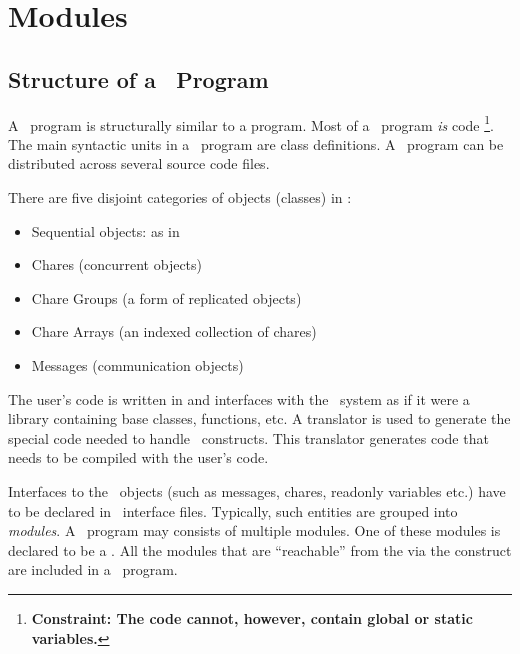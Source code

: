 \section{Modules}

\subsection{Structure of a \charmpp\ Program}

A \charmpp\ program is structurally similar to a \CC{} program.  Most of a
\charmpp\ program {\em is} \CC{} code \footnote{\bf Constraint: The \CC{} code
cannot, however, contain global or static variables.}. The main syntactic units
in a \charmpp\ program are class definitions. A \charmpp\ program can be
distributed across several source code files.

There are five disjoint categories of objects (classes) in \charmpp:

\begin{itemize}
\item Sequential objects: as in \CC{}
\item Chares (concurrent objects) 
\item Chare Groups  (a form of replicated objects)
\item Chare Arrays  (an indexed collection of chares)
\item Messages (communication objects)
\end{itemize}

The user's code is written in \CC{} and interfaces with the \charmpp\ system as
if it were a library containing base classes, functions, etc.  A translator is
used to generate the special code needed to handle \charmpp\ constructs.  This
translator generates \CC{} code that needs to be compiled with the user's code.

Interfaces to the \charmpp\ objects (such as messages, chares, readonly
variables etc.)  have to be
declared in \charmpp\ interface files. Typically, such entities are grouped
 into {\em modules}. A \charmpp\ program may consists of multiple
modules.  One of these modules is declared to be a . All the
modules that are ``reachable'' from the  via the 
construct are included in a \charmpp\ program.

